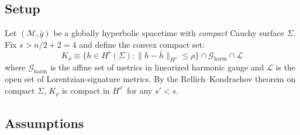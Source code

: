 \documentclass[12pt,a4paper]{article}
\begin{document}
\subsection{Setup}

Let $(\mathcal{M},\bar{g})$ be a globally hyperbolic spacetime with \emph{compact} Cauchy
surface $\Sigma$. Fix $s > n/2 + 2 = 4$ and define the convex compact set:
\begin{equation}
K_\rho \equiv \bigl\{h \in H^s(\Sigma) : \|h-\bar{h}\|_{H^s} \leq \rho\bigr\}
\cap \mathcal{G}_{\text{harm}} \cap \mathcal{L}
\label{eq:K_rho}
\end{equation}
where $\mathcal{G}_{\text{harm}}$ is the affine set of metrics in linearized harmonic
gauge and $\mathcal{L}$ is the open set of Lorentzian-signature metrics. By the
Rellich--Kondrachov theorem on compact $\Sigma$, $K_\rho$ is compact in $H^{s'}$ for
any $s' < s$.

\subsection{Assumptions}
\end{document}
